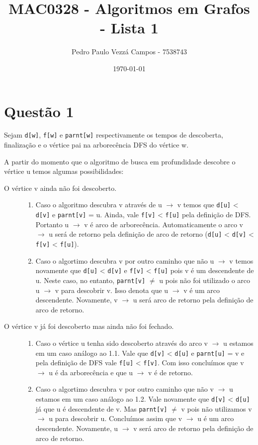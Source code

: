 \documentclass[12pt, a4paper, oneside]{article}
\title{\huge{MAC0328 - Algoritmos em Grafos - Lista 1}}
\author{Pedro Paulo Vezzá Campos - 7538743}
\date{\today}
\begin{document}
\maketitle

\section*{Questão 1} Sejam \texttt{d[w]}, \texttt{f[w]} e \texttt{parnt[w]}
respectivamente os tempos de descoberta, finalização e o vértice pai na
arborecência DFS do vértice w.

A partir do momento que o algoritmo de busca em profundidade descobre o vértice
u temos algumas possibilidades:
\begin{description}
  \item [O vértice v ainda não foi descoberto.] \hfill
  	\begin{enumerate}
  		\item Caso o algoritmo descubra v através de u $\rightarrow$ v temos que
  			\texttt{d[u]} < \texttt{d[v]} e \texttt{parnt[v]} = u. Ainda, vale
  			\texttt{f[v]} < \texttt{f[u]} pela definição de DFS. Portanto u
  			$\rightarrow$ v é arco de arborecência. Automaticamente o arco v
  			$\rightarrow$ u será de retorno pela definição de arco de retorno
  			(\texttt{d[u]} < \texttt{d[v]} < \texttt{f[v]} < \texttt{f[u]}).
		\item Caso o algortimo descubra v por outro caminho que não u $\rightarrow$ v
			temos novamente que \texttt{d[u]} < \texttt{d[v]} e \texttt{f[v]} <
			\texttt{f[u]} pois v é um descendente de u. Neste caso, no entanto,
			\texttt{parnt[v]} $\ne$ u pois não foi utilizado o arco u $\rightarrow$ v para
			descobrir v. Isso denota que u $\rightarrow$ v é um arco descendente.
			Novamente, v $\rightarrow$ u será arco de retorno pela definição de arco de
		retorno.
	\end{enumerate}
\end{description}

\begin{description}
  \item [O vértice v já foi descoberto mas ainda não foi fechado.] \hfill
	\begin{enumerate}
	  \item Caso o vértice
u tenha sido descoberto através do arco v $\rightarrow$ u estamos em um caso análogo ao
1.1. Vale que \texttt{d[v]} < \texttt{d[u]} e \texttt{parnt[u]} = v e pela definição de DFS vale \texttt{f[u]} <
\texttt{f[v]}. Com isso concluímos que v $\rightarrow$ u é da arborecência e que u $\rightarrow$ v é de
retorno.
	  \item Caso o algortimo descubra v por outro caminho que não v $\rightarrow$ u
estamos em um caso análogo ao 1.2. Vale novamente que \texttt{d[v]} < \texttt{d[u]} já que u é
descendente de v. Mas \texttt{parnt[v]} $\ne$ v pois não utilizamos v
$\rightarrow$ u para descobrir u. Concluímos assim que v $\rightarrow$ u é um arco
descendente. Novamente, u $\rightarrow$ v será arco de retorno pela definição de arco de retorno.
	\end{enumerate}
\end{description}
\end{document}
